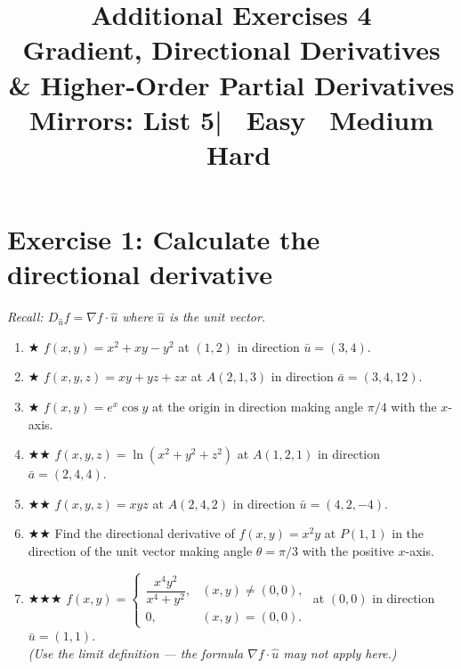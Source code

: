 \documentclass[12pt,a4paper]{article}
\title{\textbf{Additional Exercises 4}\\
\large Gradient, Directional Derivatives \& Higher-Order Partial Derivatives\\[4pt]
\normalsize Mirrors: List 5\quad|\quad
\easy\ Easy \quad \medium\ Medium \quad \hard\ Hard}
\date{}
\newcommand{\easy}{{\color{green!60!black}$\bigstar$}}
\newcommand{\medium}{{\color{orange}$\bigstar\bigstar$}}
\newcommand{\hard}{{\color{red}$\bigstar\bigstar\bigstar$}}
\begin{document}
\maketitle
\thispagestyle{empty}

\section*{Exercise 1: Calculate the directional derivative}

\emph{Recall: $D_{\hat{u}}f = \nabla f\cdot\hat{u}$ where $\hat{u}$ is the unit vector.}

\begin{enumerate}[leftmargin=*, label=(\alph*)]

\item \easy\quad
$f(x,y) = x^2+xy-y^2$ at $(1,2)$ in direction $\bar{u}=(3,4)$.

\item \easy\quad
$f(x,y,z) = xy+yz+zx$ at $A(2,1,3)$ in direction $\bar{a}=(3,4,12)$.

\item \easy\quad
$f(x,y) = e^x\cos y$ at the origin in direction making angle $\pi/4$ with the $x$-axis.

\item \medium\quad
$f(x,y,z) = \ln(x^2+y^2+z^2)$ at $A(1,2,1)$ in direction $\bar{a}=(2,4,4)$.

\item \medium\quad
$f(x,y,z) = xyz$ at $A(2,4,2)$ in direction $\bar{u}=(4,2,-4)$.

\item \medium\quad
Find the directional derivative of $f(x,y) = x^2 y$ at $P(1,1)$ in the direction
of the unit vector making angle $\theta = \pi/3$ with the positive $x$-axis.

\item \hard\quad
$f(x,y)=\begin{cases}
\dfrac{x^4 y^2}{x^4+y^2}, & (x,y)\ne(0,0),\\[6pt]
0, & (x,y)=(0,0).
\end{cases}$
at $(0,0)$ in direction $\bar{u}=(1,1)$.\\
\emph{(Use the limit definition --- the formula $\nabla f\cdot\hat{u}$ may not apply here.)}

\end{enumerate}

\end{document}
